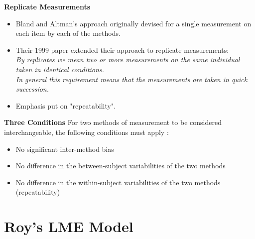 \documentclass[compress]{beamer}        %
\makeatletter
\newcommand{\tcb}{\textcolor{beamer@blendedblue}}
\makeatother
\begin{document}
\begin{frame}{\bf \tcb{Replicate Measurements}}
	\large
\begin{itemize}\itemsep0.7cm
\item Bland and Altman's approach originally devised for a single measurement on each item by each of the methods.
\item Their 1999 paper \cite{BA99} extended their approach to replicate measurements:\\ \emph{By replicates we mean two or more measurements on the same
individual taken in identical conditions. \\In general this requirement means that the
measurements are taken in quick succession. }
\item Emphasis put on "repeatability".
\end{itemize}
\end{frame}


\begin{frame}{\bf \tcb{Three Conditions}}
For two methods of measurement to be considered interchangeable, the following conditions must apply \cite{Roy2009}:
\\
\begin{itemize}\itemsep0.5cm
\item No significant inter-method bias
\item No difference in the between-subject variabilities of the two methods
\item No difference in the within-subject variabilities of the two methods (repeatability)
\end{itemize}
\end{frame}

\section[Roy's LME Model]{Roy's LME Model}
\end{document}
